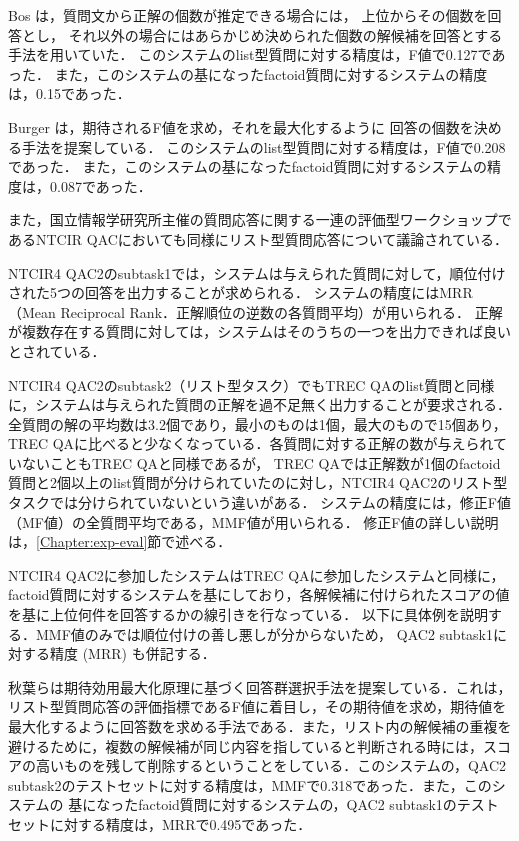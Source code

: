 \documentclass[japanese]{jnlp_1.4}
\begin{document}
Bos \cite{Bos:TheLaSapienzaQuestionAnsweringsystematTREC2006}は，質問文から正解の個数が推定できる場合には，
上位からその個数を回答とし，
それ以外の場合にはあらかじめ決められた個数の解候補を回答とする手法を用いていた．
このシステムのlist型質問に対する精度は，F値で0.127であった．
また，このシステムの基になったfactoid質問に対するシステムの精度は，0.15であった．

Burger \cite{Burger:MITREsQandaatTREC15}は，期待されるF値を求め，それを最大化するように
回答の個数を決める手法を提案している．
このシステムのlist型質問に対する精度は，F値で0.208であった．
また，このシステムの基になったfactoid質問に対するシステムの精度は，0.087であった．

また，国立情報学研究所主催の質問応答に関する一連の評価型ワークショップであるNTCIR QACにおいても同様にリスト型質問応答について議論されている．

NTCIR4 QAC2のsubtask1では，システムは与えられた質問に対して，順位付けされた5つの回答を出力することが求められる．
システムの精度にはMRR（Mean Reciprocal Rank．正解順位の逆数の各質問平均）が用いられる．
正解が複数存在する質問に対しては，システムはそのうちの一つを出力できれば良いとされている．

NTCIR4 QAC2のsubtask2（リスト型タスク）\cite{Fukumoto:QAC2Subtask12}でもTREC QAのlist質問と同様に，システムは与えられた質問の正解を過不足無く出力することが要求される．全質問の解の平均数は3.2個であり，最小のものは1個，最大のもので15個あり，TREC QAに比べると少なくなっている．各質問に対する正解の数が与えられていないこともTREC QAと同様であるが，
TREC QAでは正解数が1個のfactoid質問と2個以上のlist質問が分けられていたのに対し，NTCIR4 QAC2のリスト型タスクでは分けられていないという違いがある．
システムの精度には，修正F値（MF値）の全質問平均である，MMF値が用いられる．
修正F値の詳しい説明は，\ref{Chapter:exp-eval}節で述べる．

NTCIR4 QAC2に参加したシステムはTREC QAに参加したシステムと同様に，factoid質問に対するシステムを基にしており，各解候補に付けられたスコアの値を基に上位何件を回答するかの線引きを行なっている．
以下に具体例を説明する．MMF値のみでは順位付けの善し悪しが分からないため，
QAC2 subtask1に対する精度 (MRR) も併記する．

秋葉ら\cite{秋葉:質問応答における常識的な解の選択と期待効用に基づく回答群の決定}は期待効用最大化原理に基づく回答群選択手法を提案している．これは，リスト型質問応答の評価指標であるF値に着目し，その期待値を求め，期待値を最大化するように回答数を求める手法である．また，リスト内の解候補の重複を避けるために，複数の解候補が同じ内容を指していると判断される時には，スコアの高いものを残して削除するということをしている．このシステムの，QAC2 subtask2のテストセットに対する精度は，MMFで0.318であった．また，このシステムの
基になったfactoid質問に対するシステムの，QAC2 subtask1のテストセットに対する精度は，MRRで0.495であった．
\end{document}
